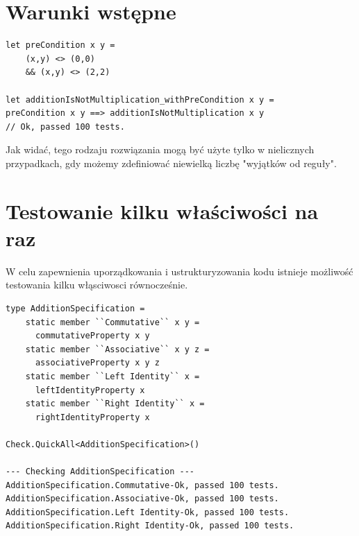 \section*{Warunki wstępne}
\lstset{language=FSharp, basicstyle=\scriptsize}
\begin{lstlisting}[frame=single,caption={Dodawanie warunków wstępnych},label=kod:listingA]
let preCondition x y =
    (x,y) <> (0,0)
    && (x,y) <> (2,2)

let additionIsNotMultiplication_withPreCondition x y =
preCondition x y ==> additionIsNotMultiplication x y
// Ok, passed 100 tests.
\end{lstlisting}

Jak widać, tego rodzaju rozwiązania mogą być użyte tylko w nielicznych przypadkach, gdy możemy zdefiniować niewielką liczbę "wyjątków od reguły".

\section*{Testowanie kilku właściwości na raz}
W celu zapewnienia uporządkowania i ustrukturyzowania kodu istnieje możliwość testowania kilku włąsciwosci równocześnie.
\lstset{language=FSharp, basicstyle=\scriptsize}
\begin{lstlisting}[frame=single,caption={Sprawdzanie wielu właściwości jednocześnie},label=kod:listingA]
type AdditionSpecification =
    static member ``Commutative`` x y =
      commutativeProperty x y
    static member ``Associative`` x y z =
      associativeProperty x y z
    static member ``Left Identity`` x =
      leftIdentityProperty x
    static member ``Right Identity`` x =
      rightIdentityProperty x
  
Check.QuickAll<AdditionSpecification>()

--- Checking AdditionSpecification ---
AdditionSpecification.Commutative-Ok, passed 100 tests.
AdditionSpecification.Associative-Ok, passed 100 tests.
AdditionSpecification.Left Identity-Ok, passed 100 tests.
AdditionSpecification.Right Identity-Ok, passed 100 tests.
\end{lstlisting}